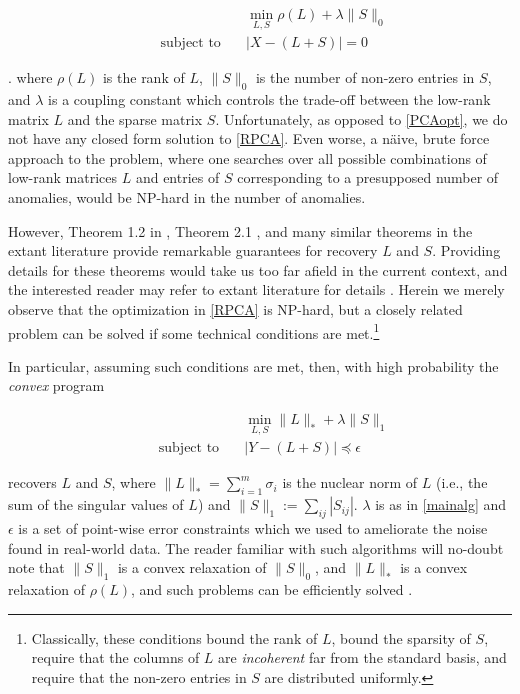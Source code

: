 \documentclass[conference]{IEEEtran}
\begin{document}
\begin{align} \label{RPCA}
  &\min_{L,S}\rho(L)+\lambda\|S\|_{0}\\ \nonumber
  \qquad \text{subject to} \quad &
                                   |X-(L+S)| = 0
\end{align}

.
\noindent where $\rho(L)$ is the rank of $L$, $\|S\|_{0}$ is the
number of non-zero entries in $S$, and $\lambda$ is a coupling
constant which controls the trade-off between the low-rank matrix $L$
and the sparse matrix $S$.  Unfortunately, as opposed to
\eqref{PCAopt}, we do not have any closed form solution to
\eqref{RPCA}.   Even worse, a n\"{a}ive, brute force
approach to the problem, where one searches over all possible
combinations of low-rank matrices $L$ and entries of $S$ corresponding
to a presupposed number of anomalies, would be NP-hard in the number
of anomalies.

However, Theorem 1.2 in \cite{Candes2011}, Theorem 2.1
\cite{Paffenroth2012a}, and many similar theorems in the extant
literature provide remarkable guarantees for recovery $L$ and $S$.
Providing details for these theorems would take us too far afield in
the current context, and the interested reader may refer to extant
literature for details \cite{Candes2009, candes09ex, Chandrasekaran2009,
  Candes2011, Paffenroth2012a, Paffenroth2013b}.
Herein we merely observe that the optimization in \eqref{RPCA} is
NP-hard, but a closely related problem can be solved if some technical
conditions are met.\footnote{Classically, these conditions bound the
  rank of $L$, bound the sparsity of $S$, require that the columns of
  $L$ are \textit{incoherent} far from the standard basis, and require
  that the non-zero entries in $S$ are distributed uniformly.}

In particular, assuming such conditions are met, then, with high
probability the \emph{convex} program

\begin{align} \label{mainalg}
  &\min_{L,S}\|L\|_{*}+\lambda\|S\|_{1}\\ \nonumber
  \qquad \text{subject to} \quad &
                                   |Y-(L+S)|
                                   \preceq \epsilon
\end{align}

\noindent recovers $L$ and $S$, where
$\|L\|_{*} = \sum_{i=1}^m\sigma_{i}$ is the nuclear norm of $L$ (i.e.,
the sum of the singular values of $L$) and
$\|S\|_1:= \sum_{ij}|S_{ij}|$.  $\lambda$ is as in \eqref{mainalg} and
$\epsilon$ is a set of point-wise error constraints which we used to
ameliorate the noise found in real-world data.  The reader familiar
with such algorithms will no-doubt note that $\|S\|_1$ is a convex
relaxation of $\|S\|_0$, and $\|L\|_*$ is a convex relaxation of
$\rho(L)$, and such problems can be efficiently solved
\cite{Boyd2010a, Candes2009, Candes2011, Paffenroth2012a,
  Paffenroth2013b, Halko2011}.
\end{document}
